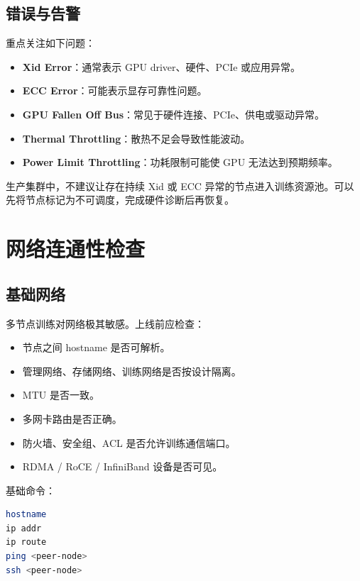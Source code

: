 \subsection{错误与告警}

重点关注如下问题：

\begin{itemize}
\item \textbf{Xid Error}：通常表示 GPU driver、硬件、PCIe 或应用异常。
\item \textbf{ECC Error}：可能表示显存可靠性问题。
\item \textbf{GPU Fallen Off Bus}：常见于硬件连接、PCIe、供电或驱动异常。
\item \textbf{Thermal Throttling}：散热不足会导致性能波动。
\item \textbf{Power Limit Throttling}：功耗限制可能使 GPU 无法达到预期频率。
\end{itemize}

生产集群中，不建议让存在持续 Xid 或 ECC 异常的节点进入训练资源池。可以先将节点标记为不可调度，完成硬件诊断后再恢复。

\section{网络连通性检查}

\subsection{基础网络}

多节点训练对网络极其敏感。上线前应检查：

\begin{itemize}
\item 节点之间 hostname 是否可解析。
\item 管理网络、存储网络、训练网络是否按设计隔离。
\item MTU 是否一致。
\item 多网卡路由是否正确。
\item 防火墙、安全组、ACL 是否允许训练通信端口。
\item RDMA / RoCE / InfiniBand 设备是否可见。
\end{itemize}

基础命令：

\begin{lstlisting}[language=bash,caption={网络基础检查},label={lst:network-basic-check}]
hostname
ip addr
ip route
ping <peer-node>
ssh <peer-node>
\end{lstlisting}

